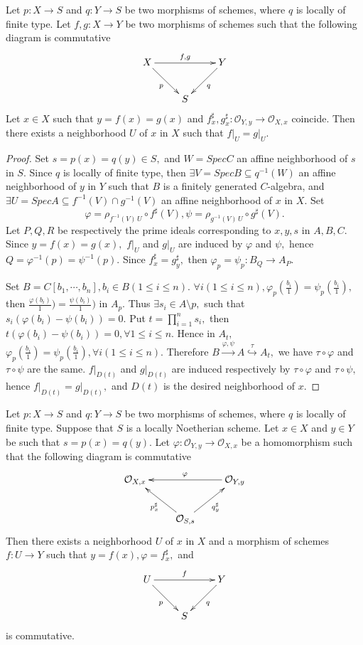 \begin{prop}
Let $p: X\rightarrow S$ and $q: Y\rightarrow S$ be two morphisms of
schemes, where $q$ is locally of finite type. Let $f,g: X\rightarrow
Y$ be two morphisms of schemes such that the following diagram is
commutative
\[ \xymatrix{
   X \ar[rr]^-{f,g} \ar[dr]_p & & Y \ar[dl]^q \\
   & S }  \]
Let $x\in X$ such that $y=f(x)=g(x)$ and $f^{\sharp}_x,g^{\sharp}_x:
\mathcal {O}_{Y,y}\rightarrow \mathcal {O}_{X,x}$ coincide. Then
there exists a neighborhood $U$ of $x$ in $X$ such that
$\left.f\right|_U=\left.g\right|_U.$
\end{prop}
\begin{proof}
Set $s=p(x)=q(y)\in S,$ and $W=SpecC$ an affine neighborhood of $s$
in $S.$ Since $q$ is locally of finite type, then $\exists
V=SpecB\subseteq q^{-1}(W)$ an affine neighborhood of $y$ in $Y$
such that $B$ is a finitely generated $C$-algebra, and $\exists
U=SpecA\subseteq f^{-1}(V)\cap g^{-1}(V)$ an affine neighborhood of
$x$ in $X.$ Set $$\varphi=\rho_{f^{-1}(V)\,U}\circ f^{\sharp}(V),
\psi=\rho_{g^{-1}(V)\,U}\circ g^{\sharp}(V).$$ Let $P, Q, R$ be
respectively the prime ideals corresponding to $x, y, s$ in $A, B,
C.$ Since $y=f(x)=g(x),$ $\left.f\right|_U$ and $\left.g\right|_U$
are induced by $\varphi$ and $\psi,$ hence
$Q=\varphi^{-1}(p)=\psi^{-1}(p).$ Since $f^{\sharp}_x=g^{\sharp}_y,$
then $\varphi_p=\psi_p: B_Q\rightarrow A_P.$

Set $B=C[b_1,\cdots,b_n], b_i\in B(1\leqslant i\leqslant n).$
$\forall i(1\leqslant i\leqslant n),
\varphi_p(\frac{b_i}{1})=\psi_p(\frac{b_i}{1}),$ then
$\frac{\varphi(b_i)}{1})=\frac{\psi(b_i)}{1})$ in $A_p.$ Thus
$\exists s_i\in A\setminus p,$ such that
$s_i(\varphi(b_i)-\psi(b_i))=0.$ Put $t=\prod\limits_{i=1}^ns_i,$
then $t(\varphi(b_i)-\psi(b_i))=0, \forall 1\leqslant i\leqslant n.$
Hence in $A_t,$ $ \varphi_p(\frac{b_i}{1})=\psi_p(\frac{b_i}{1}),
\forall i(1\leqslant i\leqslant n).$ Therefore
$B\stackrel{\varphi,\psi}{\longrightarrow}
A\stackrel{\tau}{\hookrightarrow} A_t,$ we have $\tau\circ\varphi$
and $\tau\circ\psi$ are the same. $\left.f\right|_{D(t)}$ and
$\left.g\right|_{D(t)}$ are induced respectively by
$\tau\circ\varphi$ and $\tau\circ\psi,$ hence
$\left.f\right|_{D(t)}=\left.g\right|_{D(t)},$ and $D(t)$ is the
desired neighborhood of $x.$
\end{proof}
\begin{prop}
Let $p: X\rightarrow S$ and $q: Y\rightarrow S$ be two morphisms of
schemes, where $q$ is locally of finite type. Suppose that $S$ is a
locally Noetherian scheme. Let $x\in X$ and $y\in Y$ be such that
$s=p(x)=q(y).$ Let $\varphi:\mathcal {O}_{Y,y}\rightarrow \mathcal
{O}_{X,x}$ be a homomorphism such that the following diagram is
commutative
\[ \xymatrix{
   {\mathcal {O}_{X,x}} & & {\mathcal {O}_{Y,y}} \ar[ll]_{\varphi}\\
   & {\mathcal {O}_{S,s}} \ar[ul]^{p^{\sharp}_x}
   \ar[ur]_{q^{\sharp}_y} }  \]
Then there exists a neighborhood $U$ of $x$ in $X$ and a morphism of
schemes $f: U\rightarrow Y$ such that $y=f(x),
\varphi=f^{\sharp}_x,$ and
\[ \xymatrix{
   U \ar[rr]^f \ar[dr]_p & & Y \ar[dl]^q \\
   & S }  \]
is commutative.
\end{prop}
